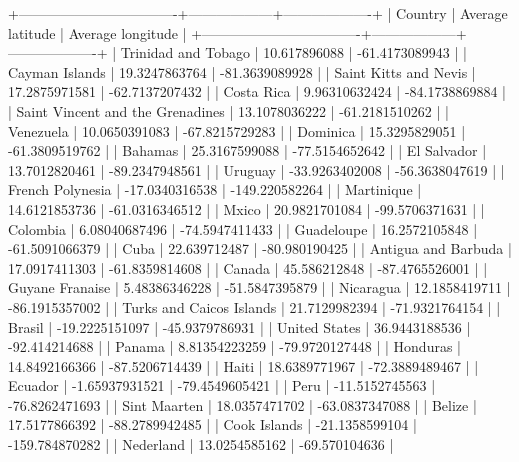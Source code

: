 +----------------------------------+------------------+-------------------+
|             Country              | Average latitude | Average longitude |
+----------------------------------+------------------+-------------------+
|       Trinidad and Tobago        |   10.617896088   |   -61.4173089943  |
|          Cayman Islands          |  19.3247863764   |   -81.3639089928  |
|      Saint Kitts and Nevis       |  17.2875971581   |   -62.7137207432  |
|            Costa Rica            |  9.96310632424   |   -84.1738869884  |
| Saint Vincent and the Grenadines |  13.1078036222   |   -61.2181510262  |
|            Venezuela             |  10.0650391083   |   -67.8215729283  |
|             Dominica             |  15.3295829051   |   -61.3809519762  |
|             Bahamas              |  25.3167599088   |   -77.5154652642  |
|           El Salvador            |  13.7012820461   |   -89.2347948561  |
|             Uruguay              |  -33.9263402008  |   -56.3638047619  |
|         French Polynesia         |  -17.0340316538  |   -149.220582264  |
|            Martinique            |  14.6121853736   |   -61.0316346512  |
|              Mxico               |  20.9821701084   |   -99.5706371631  |
|             Colombia             |  6.08040687496   |   -74.5947411433  |
|            Guadeloupe            |  16.2572105848   |   -61.5091066379  |
|               Cuba               |   22.639712487   |   -80.980190425   |
|       Antigua and Barbuda        |  17.0917411303   |   -61.8359814608  |
|              Canada              |   45.586212848   |   -87.4765526001  |
|         Guyane Franaise          |  5.48386346228   |   -51.5847395879  |
|            Nicaragua             |  12.1858419711   |   -86.1915357002  |
|     Turks and Caicos Islands     |  21.7129982394   |   -71.9321764154  |
|              Brasil              |  -19.2225151097  |   -45.9379786931  |
|          United States           |  36.9443188536   |   -92.414214688   |
|              Panama              |  8.81354223259   |   -79.9720127448  |
|             Honduras             |  14.8492166366   |   -87.5206714439  |
|              Haiti               |  18.6389771967   |   -72.3889489467  |
|             Ecuador              |  -1.65937931521  |   -79.4549605421  |
|               Peru               |  -11.5152745563  |   -76.8262471693  |
|           Sint Maarten           |  18.0357471702   |   -63.0837347088  |
|              Belize              |  17.5177866392   |   -88.2789942485  |
|           Cook Islands           |  -21.1358599104  |   -159.784870282  |
|            Nederland             |  13.0254585162   |   -69.570104636   |
